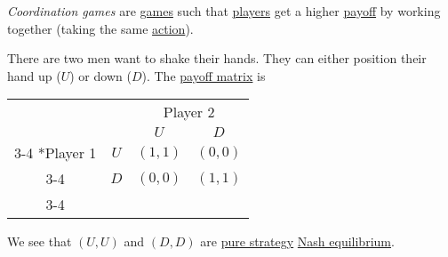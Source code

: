 \begin{definition}\label{def:coordination-game}
	\emph{Coordination games} are \hyperref[def:game]{games} such that \hyperref[def:player]{players} get a higher \hyperref[def:reward]{payoff} by working
	together (taking the same \hyperref[def:strategy]{action}).
\end{definition}

\begin{eg}\label{eg:shaking-hands}
	There are two men want to shake their hands. They can either position their hand up (\(U\)) or down (\(D\)). The \hyperref[def:payoff-matrix]{payoff matrix}
	is
	\begin{table}[H]
		\centering
		\setlength{\extrarowheight}{2pt}
		\begin{tabular}{cc|c|c|}
			                        & \multicolumn{1}{c}{} & \multicolumn{2}{c}{Player 2}                           \\
			                        & \multicolumn{1}{c}{} & \multicolumn{1}{c}{$U$}      & \multicolumn{1}{c}{$D$} \\\cline{3-4}
			\multirow{2}*{Player 1} & $U$                  & $(1, 1)$                     & $(0, 0)$                \\\cline{3-4}
			                        & $D$                  & $(0, 0)$                     & $(1, 1)$                \\\cline{3-4}
		\end{tabular}
	\end{table}
	We see that \((U, U)\) and \((D, D)\) are \hyperref[def:pure-strategy]{pure strategy} \hyperref[def:Nash-equilibrium]{Nash equilibrium}.
\end{eg}

